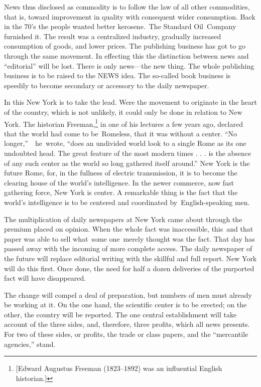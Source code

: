 \documentclass[openany,nobib]{tufte-book}
\begin{document}
News thus disclosed as commodity is to follow the law of all other
commodities, that is, toward improvement in quality with consequent
wider consumption. Back in the 70's the people wanted better
kerosene.~The Standard Oil~Company furnished it. The result was a
centralized industry, gradually increased consumption of goods, and
lower prices. The publishing business has got to go through the same
movement. In effecting this the distinction between news and
``editorial'' will be lost. There is only news---the new thing. The
whole publishing business is to be raised to the NEWS idea. The
so-called book business is speedily to become secondary or accessory to
the daily newspaper.~

In this New York is to take the lead. Were the movement to originate in
the heart of the country, which is not unlikely, it could only be done
in relation to New York. The historian Freeman,\footnote{{[}Edward
  Augustus Freeman (1823--1892) was an influential English historian.{]}}
in one of his lectures a few years ago, declared that the world had come
to be~Romeless, that it was without a center. ``No
longer,''~~he~wrote, ``does an undivided world look to a single Rome as
its one undoubted head. The great feature of the most modern times . . .
is the absence of any such center as the world so long gathered itself
around.'' New York is the future Rome, for, in the fullness of electric
transmission, it is to become the clearing house of the world's
intelligence. In the newer commerce, now fast gathering force, New York
is center. A remarkable thing is the fact that the world's intelligence
is to be centered and coordinated by~English-speaking men.~

The multiplication of daily newspapers at New York came about through
the premium placed on opinion. When the whole fact was inaccessible,
this~and that paper was able to sell what~some one~merely thought was
the fact. That day has passed away with the incoming of more complete
access. The daily newspaper of the future will replace editorial writing
with the skillful and full report. New York will do this first. Once
done, the need for half a dozen deliveries of the purported fact will
have disappeared.~

The change will compel a deal of preparation, but numbers of men must
already be working at it. On the one hand, the scientific center is to
be erected; on the other, the country will be reported. The one central
establishment will take account of the three sides, and, therefore,
three profits, which all news presents. For two of these sides, or
profits, the trade or class papers, and the ``mercantile agencies,''
stand.~
\end{document}
